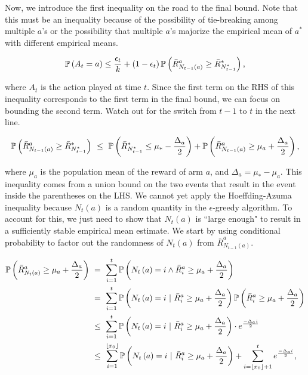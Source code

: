 \documentclass[11pt]{article}
\begin{document}
\noindent Now, we introduce the first inequality on the road to the final bound. Note that this must be an inequality because of the possibility of tie-breaking among multiple $a$'s or the possibility that multiple $a$'s majorize the empirical mean of $a^*$ with different empirical means.

\begin{align}
	\mathbb{P}\left( A_t = a \right) \leq \frac{\epsilon_t}{k} + \left( 1 - \epsilon_t \right) \mathbb{P}\left( \bar{R}_{N_{t-1}\left( a \right)}^a \geq \bar{R}_{N_{t-1}^*}^* \right) \textnormal{,} \label{line1}
\end{align}

\noindent where $A_t$ is the action played at time $t$. Since the first term on the RHS of this inequality corresponds to the first term in the final bound, we can focus on bounding the second term. Watch out for the switch from $t - 1$ to $t$ in the next line.

\begin{align}
	\mathbb{P}\left( \bar{R}_{N_{t-1}\left( a \right)}^a \geq \bar{R}_{N_{t-1}^*}^* \right)\ \leq\ \mathbb{P}\left( \bar{R}_{N_{t-1}^*}^* \leq \mu_* - \frac{\Delta_a}{2} \right) + \mathbb{P}\left( \bar{R}_{N_{t-1}\left( a \right)}^a \geq \mu_a + \frac{\Delta_a}{2} \right) \textnormal{,} \label{line2}
\end{align}

\noindent where $\mu_a$ is the population mean of the reward of arm $a$, and $\Delta_a = \mu_* - \mu_a$. This inequality comes from a union bound on the two events that result in the event inside the parentheses on the LHS. We cannot yet apply the Hoeffding-Azuma inequality because $N_t \left( a \right)$ is a random quantity in the $\epsilon$-greedy algorithm. To account for this, we just need to show that $N_t \left( a \right)$ is ``large enough" to result in a sufficiently stable empirical mean estimate. We start by using conditional probability to factor out the randomness of $N_t \left( a \right)$ from $\bar{R}_{N_{t-1}\left( a \right)}^a$.

\begin{align}
\prob{\bar{R}_{N_t\left( a \right)}^a \geq \mu_a + \frac{\Delta_a}{2}}\ &=\ \sum_{i=1}^t \prob{N_t \left( a \right) = i \land \bar{R}_i^a \geq \mu_a + \frac{\Delta_a}{2}} \label{line3}\\
&=\ \sum_{i=1}^t \prob{N_t \left( a \right) = i\ |\ \bar{R}_i^a \geq \mu_a + \frac{\Delta_a}{2}} \prob{\bar{R}_i^a \geq \mu_a + \frac{\Delta_a}{2}} \label{line4} \\ 
&\leq\ \sum_{i=1}^t \prob{N_t \left( a \right) = i\ |\ \bar{R}_i^a \geq \mu_a + \frac{\Delta_a}{2}} \cdot e^{\frac{-\Delta_a i}{2}} \label{line5}\\
&\leq\  \sum_{i=1}^{\lfloor x_0 \rfloor} \prob{N_t \left( a \right) = i\ |\ \bar{R}_i^a \geq \mu_a + \frac{\Delta_a}{2}} + \sum_{i = \lfloor x_0 \rfloor + 1}^t e^{\frac{-\Delta_a i}{2}} \textnormal{,} \label{line6}
\end{align}
\end{document}
